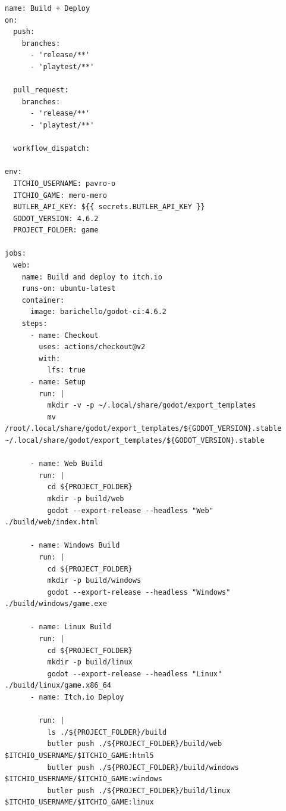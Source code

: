 \begin{verbatim}
name: Build + Deploy
on:
  push:
    branches:
      - 'release/**'
      - 'playtest/**'

  pull_request:
    branches:
      - 'release/**'
      - 'playtest/**'

  workflow_dispatch:

env:
  ITCHIO_USERNAME: pavro-o
  ITCHIO_GAME: mero-mero
  BUTLER_API_KEY: ${{ secrets.BUTLER_API_KEY }}
  GODOT_VERSION: 4.6.2
  PROJECT_FOLDER: game

jobs:
  web:
    name: Build and deploy to itch.io
    runs-on: ubuntu-latest
    container:
      image: barichello/godot-ci:4.6.2
    steps:
      - name: Checkout
        uses: actions/checkout@v2
        with:
          lfs: true
      - name: Setup
        run: |
          mkdir -v -p ~/.local/share/godot/export_templates
          mv /root/.local/share/godot/export_templates/${GODOT_VERSION}.stable ~/.local/share/godot/export_templates/${GODOT_VERSION}.stable
      
      - name: Web Build
        run: |
          cd ${PROJECT_FOLDER}
          mkdir -p build/web
          godot --export-release --headless "Web" ./build/web/index.html
      
      - name: Windows Build
        run: |
          cd ${PROJECT_FOLDER}
          mkdir -p build/windows
          godot --export-release --headless "Windows" ./build/windows/game.exe

      - name: Linux Build
        run: |
          cd ${PROJECT_FOLDER}
          mkdir -p build/linux
          godot --export-release --headless "Linux" ./build/linux/game.x86_64
      - name: Itch.io Deploy

        run: |
          ls ./${PROJECT_FOLDER}/build
          butler push ./${PROJECT_FOLDER}/build/web $ITCHIO_USERNAME/$ITCHIO_GAME:html5
          butler push ./${PROJECT_FOLDER}/build/windows $ITCHIO_USERNAME/$ITCHIO_GAME:windows
          butler push ./${PROJECT_FOLDER}/build/linux $ITCHIO_USERNAME/$ITCHIO_GAME:linux
\end{verbatim}